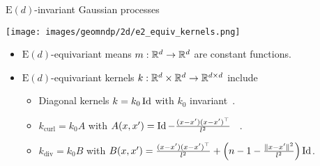 


\begin{frame}{$\mathrm{E}(d)$-invariant Gaussian processes}
    
    \begin{center}
        \texttt{[image: images/geomndp/2d/e2\_equiv\_kernels.png]}
    \end{center}

    \begin{itemize}
    \item $\mathrm{E}(d)$-equivariant means $m: \mathbb{R}^d \rightarrow \mathbb{R}^d$ are constant functions.
    \pause
    \item $\mathrm{E}(d)$-equivariant kernels $k: \mathbb{R}^d \times \mathbb{R}^d \rightarrow \mathbb{R}^{d\times d}$ include
    \begin{itemize} [triangle]
        \item Diagonal kernels $k = k_0 \operatorname{Id}$ with $k_0$ invariant~\cite{holderrieth2021equivariant}.
        \item $k_\mathrm{curl} = k_0 A$ with $A(x, x') = \operatorname{Id} - \frac{(x - x')(x - x')^\top}{l^2}$ ~\cite{macedo2010learning}.
        \item $k_\mathrm{div} = k_0 B$ with $ B(x, x') =\frac{(x - x')(x - x')^\top}{l^2} + \left( n -1 - \frac{\|x - x' \|^2}{l^2} \right) \operatorname{Id}$. %
    \end{itemize}
\end{itemize}

\end{frame}




